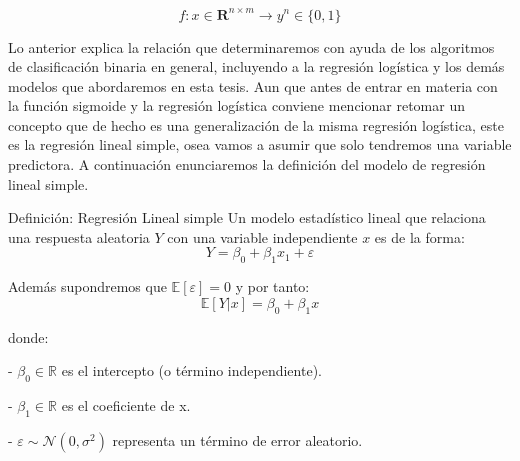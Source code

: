 \[
	f :x\in \mathbf{R}^{n\times m} \rightarrow y^n\in  \{0,1\}
\]

Lo anterior explica la relación que determinaremos con ayuda de los algoritmos de clasificación binaria en general, incluyendo a la regresión logística y los demás modelos que abordaremos en esta tesis. Aun que antes de entrar en materia con la función sigmoide y la regresión logística conviene mencionar retomar un concepto que de hecho es una generalización de la misma regresión logística, este es la regresión lineal simple, osea vamos a asumir que solo tendremos una variable predictora. A continuación enunciaremos la definición del modelo de regresión lineal simple.

\begin{definicion}{Definición: Regresión Lineal simple}
	Un modelo estadístico lineal que relaciona una respuesta aleatoria $Y$ con una variable independiente $x$ es de la forma:
	\begin{equation}
		Y = \beta_0 + \beta_1 x_1 + \varepsilon
	\label{EC:RLineal}
	\end{equation}
	
	Además supondremos que $\mathbb{E}[\varepsilon] = 0$ y por tanto:
	\begin{equation}
		\mathbb{E}[Y|x] = \beta_0 + \beta_1 x
		\label{EC:RLinealAjustado}
	\end{equation}
	
	donde:
	
	- $\beta_0 \in \mathbb{R}$ es el intercepto (o término independiente).
	
	- $\beta_1 \in \mathbb{R}$ es el coeficiente de x.
	
	- $\varepsilon \sim \mathcal{N}(0, \sigma^2)$ representa un término de error aleatorio.
	

\end{definicion}

